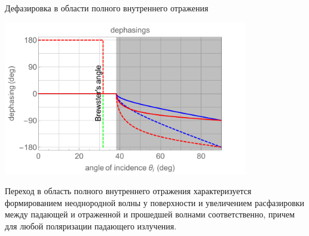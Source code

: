 \documentclass[9pt, compress, xcolor=table]{beamer}
\begin{document}
\begin{frame}{Дефазировка в области полного внутреннего отражения}

\begin{center}
\includegraphics[width=0.8\textwidth]{fc_d}
\end{center}

Переход в область полного внутреннего отражения характеризуется формированием неоднородной волны у поверхности и увеличением расфазировки между падающей и отраженной и прошедшей волнами соответственно, причем для любой поляризации падающего излучения.


\end{frame}
\end{document}
